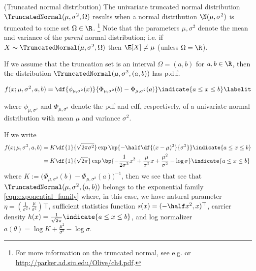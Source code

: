\documentclass{article} %
\newcommand{\sufficientStatsFunction}{s}
\newcommand{\carrierDensity}{h}
\begin{document}
\begin{example}{(Truncated normal distribution)} 
\label{ex:truncated_normal_as_ef} The univariate truncated normal distribution $\TruncatedNormal(\mu,  \sigma^2,  \Omega)$ results when a normal distribution $\N(\mu,  \sigma^2)$ is truncated to some set $\Omega \in \R$. \footnote{For more information on the truncated normal,  see e.g.  \cite{burkardt2014truncated} or \url{http://parker.ad.siu.edu/Olive/ch4.pdf}.}   Note that the parameters $\mu, \sigma^2$ denote the mean and variance of the \textit{parent} normal distribution;  i.e.  if $X \sim \TruncatedNormal(\mu,  \sigma^2,  \Omega)$ then $\E[X] \neq \mu$ (unless $\Omega = \R$). 

If we assume that the truncation set is an interval $\Omega = (a,b)$ for $a,b \in \R$,  then the distribution $\TruncatedNormal(\mu,  \sigma^2,  (a,b))$ has p.d.f.

\begin{align*}
f(x ; \mu,  \sigma^2,  a,  b) = \df{\phi_{\mu, \sigma^2} (x) }{\Phi_{\mu, \sigma^2} (b)  - \Phi_{\mu, \sigma^2} (a) } \indicate{a \leq x \leq b} \labelit \label{eqn:pdf_of_normal_truncated_to_an_interval}
\end{align*} 

where $\phi_{\mu,  \sigma^2}$ and $\Phi_{\mu,  \sigma^2}$ denote the pdf and cdf,  respectively,  of a univariate normal distribution with mean $\mu$ and variance $\sigma^2$.   

If we write
\begin{align*}
f(x ; \mu,  \sigma^2,  a,  b) & = K \df{1}{\sqrt{2 \pi \sigma^2}} \exp \bp{-\half \df{(x-\mu)^2}{\sigma^2}}  \indicate{a \leq x \leq b} \\
& = K \df{1}{\sqrt{2 \pi}} \exp \bp{ - \frac{1}{2 \sigma^2} x^2 + \frac{\mu}{\sigma^2} x  + \frac{\mu^2}{\sigma^2}  - \log \sigma}  \indicate{a \leq x \leq b} 
\end{align*} 
where $K := \big( \Phi_{\mu, \sigma^2} (b)  - \Phi_{\mu, \sigma^2} (a) \big)^{-1}$,  then we see that see that  $\TruncatedNormal(\mu,  \sigma^2,  (a,b))$ belongs to the exponential family \eqref{eqn:exponential_family} where,  in this case,  we have natural parameter $\eta = (\frac{1}{\sigma^2},  \frac{\mu}{\sigma^2})\top$,  sufficient statistics function $\sufficientStatsFunction(x) = (-\half x^2,  x)^\top$,  carrier density $\carrierDensity(x) =  \frac{1}{\sqrt{2 \pi}}  \indicate{a \leq x \leq b}$,  and log normalizer $a(\theta) = \log K + \frac{\mu^2}{\sigma^2} - \log \sigma$.
 
\end{example}
\end{document}
